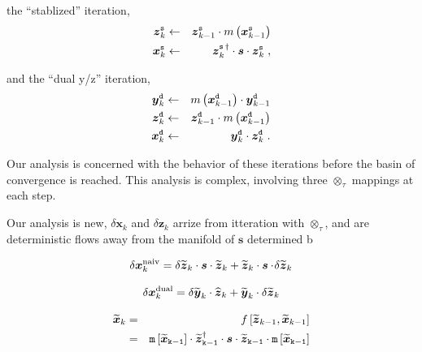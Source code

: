 \documentclass[letterpaper,twocolumn,amsmath,amsfont,amssymb,english,aps,jcp,preprintnumbers,groupaddress,nofootinbib,tightenlines]{revtex4}
\newcommand{\mat}[1]{\boldsymbol{#1}}
\newcommand{\ot}{ {\scriptstyle \otimes}_{ \tau } }
\begin{document}
the ``stablized'' iteration,
\begin{eqnarray}
\mat{z}^{\tt s}_{k}  &\leftarrow& \mat{z}^{\tt s}_{k-1}  \cdot m \left( \mat{x}^{\tt s}_{k-1} \right) \\
\mat{x}^{\tt s}_{k} &\leftarrow& \mat{z}^{\tt s \, \dagger}_{k} \cdot \mat{s} \cdot \mat{z}^{\tt s}_{k} \; ,
\end{eqnarray}

and the ``dual y/z'' iteration,
\begin{eqnarray}
\mat{y}^{\tt d}_{k}  &\leftarrow& m \left( \mat{x}^{\tt d}_{k-1} \right) \cdot \mat{y}^{\tt d}_{k-1}  \\
\mat{z}^{\tt d}_{k}  &\leftarrow& \mat{z}^{\tt d}_{k-1}  \cdot m \left( \mat{x}^{\tt d}_{k-1} \right) \\
\mat{x}^{\tt d}_{k} &\leftarrow& \mat{y}^{\tt d}_{k} \cdot \mat{z}^{\tt d}_{k} \; .
\end{eqnarray}

Our analysis is concerned with the behavior of these iterations before the basin of convergence
is reached.  This analysis is complex, involving three $\ot$ mappings at each step.  


Our analysis is new, 
$\delta \mat{x}_k$ and $\delta \mat{z}_k$ arrize from itteration with $\ot$, and are deterministic 
flows away from the manifold of $\mat{s}$ determined b


\begin{equation}
\delta \mat{x}^{\rm{naiv}}_k =   \delta  \widetilde{ \mat{z}}_{k} \cdot \mat{s} \cdot \widetilde{\mat{z}}_{k} 
                           +  \widetilde{\mat{z}}_{k} \cdot \mat{s} \cdot \! \delta \widetilde{\mat{z}}_{k} 
\end{equation}



\begin{equation}
\delta \mat{x}^{\rm{dual}}_k =   \delta  \widetilde{ \mat{y}}_{k} \cdot \widehat{\mat{z}}_{k} 
                           +  \widetilde{\mat{y}}_{k} \cdot \delta \widetilde{\mat{z}}_{k} 
\end{equation}


\begin{eqnarray}
\widetilde{\mat{x}}_k &=& f \left[\widetilde{\mat{z}}_{k-1} , \widetilde{\mat{x}}_{k-1} \right] \\ 
&=&
\tt{m} \left[ \widetilde{\mat{x}}_{k-1}\right] \cdot \widetilde{\mat{z}}^\dagger_{k-1}  
\cdot \mat{s} \cdot \widetilde{\mat{z}}_{k-1} \cdot \tt{m}\left[ \widetilde{\mat{x}}_{k-1} \right] 
\nonumber
\end{eqnarray}
\end{document}

